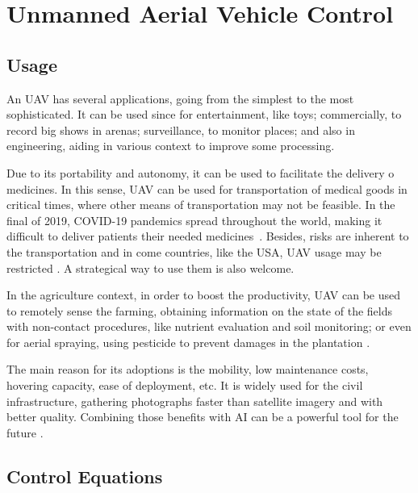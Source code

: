 \section{Unmanned Aerial Vehicle Control}

\subsection{Usage}

An UAV has several applications, going from the simplest to the most sophisticated. It can be used since for entertainment, like toys; commercially, to record big shows in arenas; surveillance, to monitor places; and also in engineering, aiding in various context to improve some processing.

Due to its portability and autonomy, it can be used to facilitate the delivery o medicines. In this sense, UAV can be used for transportation of medical goods in critical times, where other means of transportation may not be feasible.
In the final of 2019, COVID-19 pandemics spread throughout the world, making it difficult to deliver patients their needed medicines~\cite{ramakrishnan2023,mcphillips2022}.
Besides, risks are inherent to the transportation and in come countries, like the USA, UAV usage may be restricted \cite{thiels2015}. 
A strategical way to use them is also welcome.

In the agriculture context, in order to boost the productivity, UAV can be used to remotely sense the farming, obtaining information on the state of the fields with non-contact procedures, like nutrient evaluation and soil monitoring; or even for aerial spraying, using pesticide to prevent damages in the plantation \cite{delcerro2021}.

The main reason for its adoptions is the mobility, low maintenance costs, hovering capacity, ease of deployment, etc. 
It is widely used for the civil infrastructure, gathering photographs faster than  satellite imagery and with better quality. 
Combining those benefits with AI can be a powerful tool for the future \cite{sivakumar2021}. 


\subsection{Control Equations}

